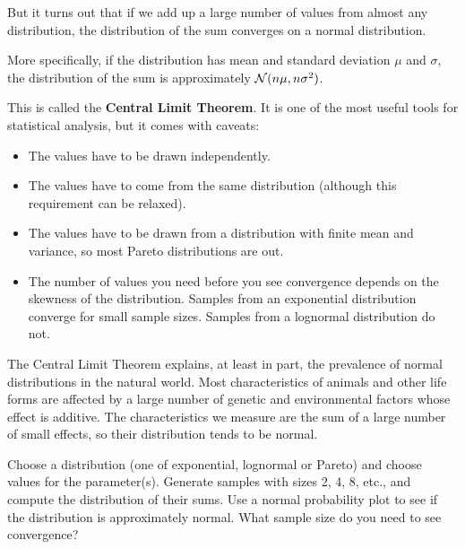 \documentclass[12pt]{book}
\begin{document}
But it turns out that if we add up a large number of values from
almost any distribution, the distribution of the sum converges on a
normal distribution.

More specifically, if the distribution has mean and standard deviation
$\mu$ and $\sigma$, the distribution of the sum is
approximately $\mathcal{N}(n \mu, n \sigma^2)$.

This is called the {\bf Central Limit Theorem}.  It is one of the
most useful tools for statistical analysis, but it comes with
caveats:

\begin{itemize}

\item The values have to be drawn independently.

\item The values have to come from the same distribution (although
  this requirement can be relaxed).

\item The values have to be drawn
  from a distribution with finite mean and variance, so most Pareto
  distributions are out.

\item The number of values you need before you see convergence depends
  on the skewness of the distribution.  Samples from an exponential
  distribution converge for small sample sizes.  Samples from a
  lognormal distribution do not.

\end{itemize}


The Central Limit Theorem explains, at least in part, the prevalence
of normal distributions in the natural world.  Most characteristics of
animals and other life forms are affected by a large number of genetic
and environmental factors whose effect is additive.  The characteristics
we measure are the sum of a large number of small effects, so their
distribution tends to be normal.

\begin{ex}

Choose a distribution (one of exponential, lognormal or Pareto) and
choose values for the parameter(s).  Generate samples with sizes
2, 4, 8, etc., and compute the distribution of their sums.  Use
a normal probability plot to see if the distribution is approximately
normal.  What sample size do you need to see convergence?

\end{ex}
\end{document}
